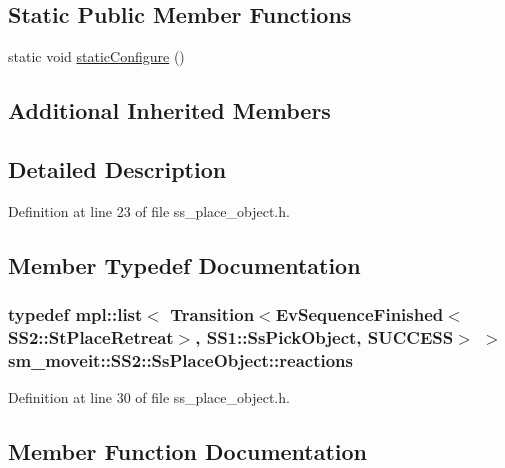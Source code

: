 \subsection*{Static Public Member Functions}
\begin{DoxyCompactItemize}
\item 
static void \hyperlink{structsm__moveit_1_1SS2_1_1SsPlaceObject_a3b82d494fc8511de679c4d1dc8bd71e2}{static\+Configure} ()
\end{DoxyCompactItemize}
\subsection*{Additional Inherited Members}


\subsection{Detailed Description}


Definition at line 23 of file ss\+\_\+place\+\_\+object.\+h.



\subsection{Member Typedef Documentation}
\subsubsection[{\texorpdfstring{reactions}{reactions}}]{\setlength{\rightskip}{0pt plus 5cm}typedef mpl\+::list$<$ Transition$<$Ev\+Sequence\+Finished$<$S\+S2\+::\+St\+Place\+Retreat$>$, {\bf S\+S1\+::\+Ss\+Pick\+Object}, {\bf S\+U\+C\+C\+E\+SS}$>$ $>$ {\bf sm\+\_\+moveit\+::\+S\+S2\+::\+Ss\+Place\+Object\+::reactions}}\hypertarget{structsm__moveit_1_1SS2_1_1SsPlaceObject_acc874c137e9181f6575d964273e5a542}{}\label{structsm__moveit_1_1SS2_1_1SsPlaceObject_acc874c137e9181f6575d964273e5a542}


Definition at line 30 of file ss\+\_\+place\+\_\+object.\+h.



\subsection{Member Function Documentation}
